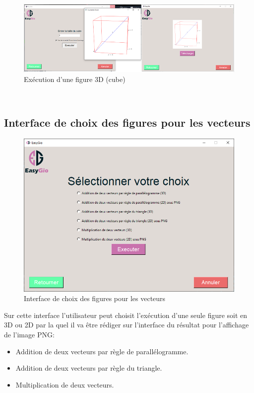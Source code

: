 \documentclass[a4paper]{report}
\begin{document}
\begin{figure}[!h]
    \centering
    \includegraphics[width=15cm]{images/CubeT.PNG}
    \caption{Exécution d'une figure 3D (cube)}
    \label{fig:Exécution d'un figure 3D (cube)}
\end{figure}\\
\subsection{Interface de choix des figures pour les vecteurs}
\begin{figure}[!h]
    \centering
    \includegraphics[width=12cm]{images/Vecteur.PNG}
    \caption{Interface de choix des figures pour les vecteurs}
    \label{fig:Interface de choix des figures pour les vecteurs}
\end{figure}
Sur cette interface l'utilisateur peut choisit l'exécution d'une seule figure soit en 3D ou 2D par la quel il va être rédiger sur l'interface du résultat pour l'affichage de l'image PNG:
\begin{itemize}
    \item Addition de deux vecteurs par règle de parallélogramme.
    \item Addition de deux vecteurs par règle du triangle.
    \item Multiplication de deux vecteurs.
\end{itemize}
\end{document}
